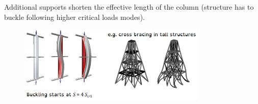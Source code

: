 \documentclass[class=report, crop=false, 12pt,a4paper]{standalone}
\begin{document}
Additional supports shorten the effective length of the column (structure has to buckle following higher critical loads modes).
\begin{figure}[H]
    \centering
    \includegraphics[width = 0.8\textwidth]{../img/diagram37.png}
    \caption{}
\end{figure}
\end{document}
